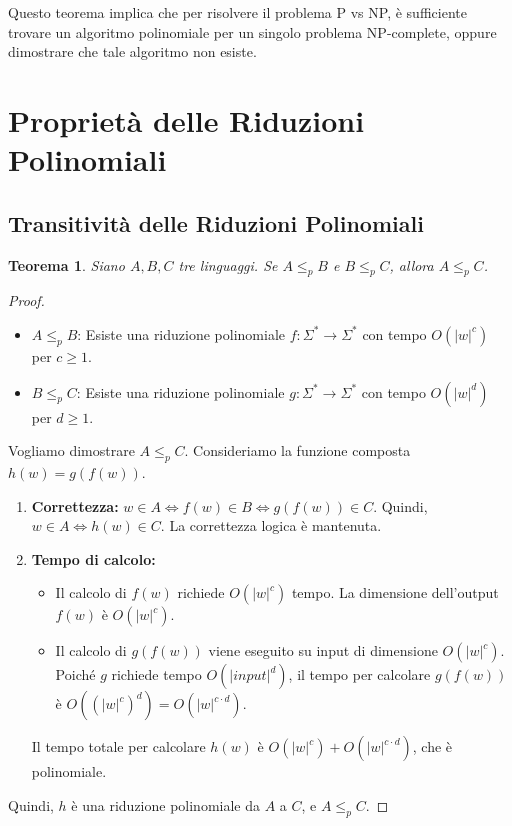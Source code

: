 \documentclass[a4paper]{article}
\newtheorem{theorem}{Teorema}
\begin{document}
Questo teorema implica che per risolvere il problema P vs NP, è sufficiente trovare un algoritmo polinomiale per un singolo problema NP-complete, oppure dimostrare che tale algoritmo non esiste.

\section{Proprietà delle Riduzioni Polinomiali}

\subsection{Transitivit\`a delle Riduzioni Polinomiali}

\begin{theorem}
Siano $A, B, C$ tre linguaggi. Se $A \le_p B$ e $B \le_p C$, allora $A \le_p C$.
\end{theorem}

\begin{proof}
\begin{itemize}
    \item $A \le_p B$: Esiste una riduzione polinomiale $f: \Sigma^* \to \Sigma^*$ con tempo $O(|w|^c)$ per $c \ge 1$.
    \item $B \le_p C$: Esiste una riduzione polinomiale $g: \Sigma^* \to \Sigma^*$ con tempo $O(|w|^d)$ per $d \ge 1$.
\end{itemize}
Vogliamo dimostrare $A \le_p C$.
Consideriamo la funzione composta $h(w) = g(f(w))$.
\begin{enumerate}
    \item \textbf{Correttezza:} $w \in A \iff f(w) \in B \iff g(f(w)) \in C$. Quindi, $w \in A \iff h(w) \in C$. La correttezza logica è mantenuta.
    \item \textbf{Tempo di calcolo:}
    \begin{itemize}
        \item Il calcolo di $f(w)$ richiede $O(|w|^c)$ tempo. La dimensione dell'output $f(w)$ è $O(|w|^c)$.
        \item Il calcolo di $g(f(w))$ viene eseguito su input di dimensione $O(|w|^c)$. Poiché $g$ richiede tempo $O(|input|^d)$, il tempo per calcolare $g(f(w))$ è $O((|w|^c)^d) = O(|w|^{c \cdot d})$.
    \end{itemize}
    Il tempo totale per calcolare $h(w)$ è $O(|w|^c) + O(|w|^{c \cdot d})$, che è polinomiale.
\end{enumerate}
Quindi, $h$ è una riduzione polinomiale da $A$ a $C$, e $A \le_p C$.
\end{proof}
\end{document}
